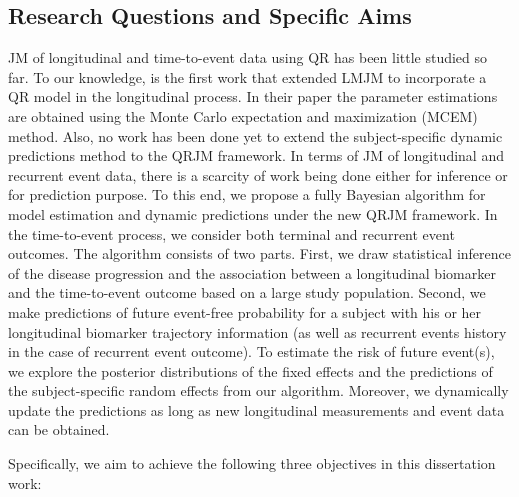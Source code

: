 \subsection{Research Questions and Specific Aims}\label{sec:bak_aims}
JM of longitudinal and time-to-event data using QR has been little studied so far. To our knowledge, \cite{farcomeni2015longitudinal} is the first work that extended LMJM to incorporate a QR model in the longitudinal process. In their paper the parameter estimations are obtained using the Monte Carlo expectation and maximization (MCEM) method.  Also, no work has been done yet to extend the subject-specific dynamic predictions method to the QRJM framework. In terms of JM of longitudinal and recurrent event data, there is a scarcity of work being done either for inference or for prediction purpose. To this end, we propose a fully Bayesian algorithm for model estimation and dynamic predictions under the new QRJM framework. In the time-to-event process, we consider both terminal and recurrent event outcomes. The algorithm consists of two parts. First, we draw statistical inference of the disease progression and the association between a longitudinal biomarker and the time-to-event outcome based on a large study population. Second, we make predictions of future event-free probability for a subject with his or her longitudinal biomarker trajectory information (as well as recurrent events history in the case of recurrent event outcome). To estimate the risk of future event(s), we explore the posterior distributions of the fixed effects and the predictions of the subject-specific random effects from our algorithm. Moreover, we dynamically update the predictions as long as new longitudinal measurements and event data can be obtained.

Specifically, we aim to achieve the following three objectives in this dissertation work:

